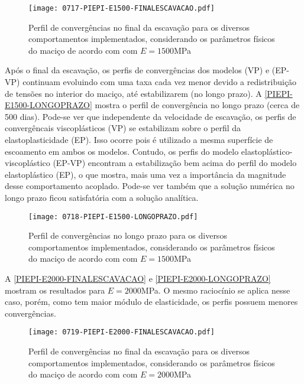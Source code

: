 \begin{figure}[H]
	\begin{center}
		\texttt{[image: 0717-PIEPI-E1500-FINALESCAVACAO.pdf]}
	\end{center}
	\caption{\label{PIEPI-E1500-FINALESCAVACAO}Perfil de convergências no final da escavação para os diversos comportamentos implementados, considerando os parâmetros físicos do maciço de acordo com  com $E=1500$MPa}
\end{figure}

Após o final da escavação, os perfis de convergências dos modelos (VP) e (EP-VP) continuam evoluindo com uma taxa cada vez menor devido a redistribuição de tensões no interior do maciço, até estabilizarem (no longo prazo). A \autoref{PIEPI-E1500-LONGOPRAZO} mostra o perfil de convergência no longo prazo (cerca de 500 dias). Pode-se ver que independente da velocidade de escavação, os perfis de convergêncais viscoplásticos (VP) se estabilizam sobre o perfil da elastoplasticidade (EP). Isso ocorre pois é utilizado a mesma superfície de escoamento em ambos os modelos. Contudo, os perfis do modelo elastoplástico-viscoplástico (EP-VP) encontram a estabilização bem acima do perfil do modelo elastoplástico (EP), o que mostra, mais uma vez a importância da magnitude desse comportamento acoplado. Pode-se ver também que a solução numérica no longo prazo ficou satisfatória com a solução analítica.

\begin{figure}[H]
	\begin{center}
		\texttt{[image: 0718-PIEPI-E1500-LONGOPRAZO.pdf]}
	\end{center}
	\caption{\label{PIEPI-E1500-LONGOPRAZO}Perfil de convergências no longo prazo para os diversos comportamentos implementados, considerando os parâmetros físicos do maciço de acordo com  com $E=1500$MPa}
\end{figure}

A \autoref{PIEPI-E2000-FINALESCAVACAO} e \autoref{PIEPI-E2000-LONGOPRAZO} mostram os resultados para $E=2000$MPa. O mesmo raciocínio se aplica nesse caso, porém, como tem maior módulo de elasticidade, os perfis possuem menores convergências.

\begin{figure}[H]
	\begin{center}
		\texttt{[image: 0719-PIEPI-E2000-FINALESCAVACAO.pdf]}
	\end{center}
	\caption{\label{PIEPI-E2000-FINALESCAVACAO}Perfil de convergências no final da escavação para os diversos comportamentos implementados, considerando os parâmetros físicos do maciço de acordo com  com $E=2000$MPa}
\end{figure}

